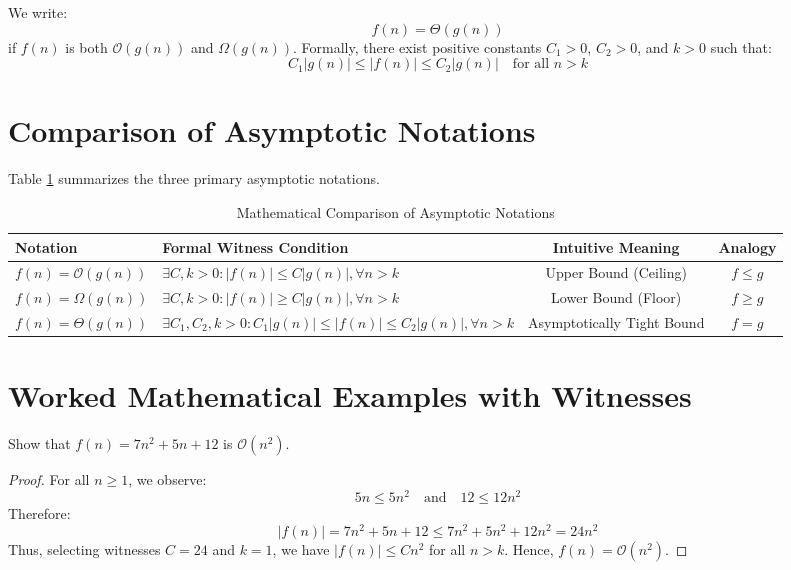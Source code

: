 \begin{definition}
We write:
$$f(n) = \Theta(g(n))$$
if $f(n)$ is both $\mathcal{O}(g(n))$ and $\Omega(g(n))$. Formally, there exist positive constants $C_1 > 0$, $C_2 > 0$, and $k > 0$ such that:
$$C_1 |g(n)| \le |f(n)| \le C_2 |g(n)| \quad \text{for all } n > k$$
\end{definition}

\section{Comparison of Asymptotic Notations}
Table \ref{tab:asymptotic_summary} summarizes the three primary asymptotic notations.

\begin{table}[htbp]
\centering
\caption{Mathematical Comparison of Asymptotic Notations}
\label{tab:asymptotic_summary}
\begin{tabularx}{\textwidth}{l X c c}
\toprule
\textbf{Notation} & \textbf{Formal Witness Condition} & \textbf{Intuitive Meaning} & \textbf{Analogy} \\
\midrule
$f(n) = \mathcal{O}(g(n))$ & $\exists C, k > 0 : |f(n)| \le C |g(n)|, \forall n > k$ & Upper Bound (Ceiling) & $f \le g$ \\
$f(n) = \Omega(g(n))$ & $\exists C, k > 0 : |f(n)| \ge C |g(n)|, \forall n > k$ & Lower Bound (Floor) & $f \ge g$ \\
$f(n) = \Theta(g(n))$ & $\exists C_1, C_2, k > 0 : C_1 |g(n)| \le |f(n)| \le C_2 |g(n)|, \forall n > k$ & Asymptotically Tight Bound & $f = g$ \\
\bottomrule
\end{tabularx}
\end{table}

\section{Worked Mathematical Examples with Witnesses}

\begin{example}
Show that $f(n) = 7n^2 + 5n + 12$ is $\mathcal{O}(n^2)$.
\begin{proof}
For all $n \ge 1$, we observe:
$$5n \le 5n^2 \quad \text{and} \quad 12 \le 12n^2$$
Therefore:
$$|f(n)| = 7n^2 + 5n + 12 \le 7n^2 + 5n^2 + 12n^2 = 24n^2$$
Thus, selecting witnesses $C = 24$ and $k = 1$, we have $|f(n)| \le C n^2$ for all $n > k$. Hence, $f(n) = \mathcal{O}(n^2)$.
\end{proof}
\end{example}

